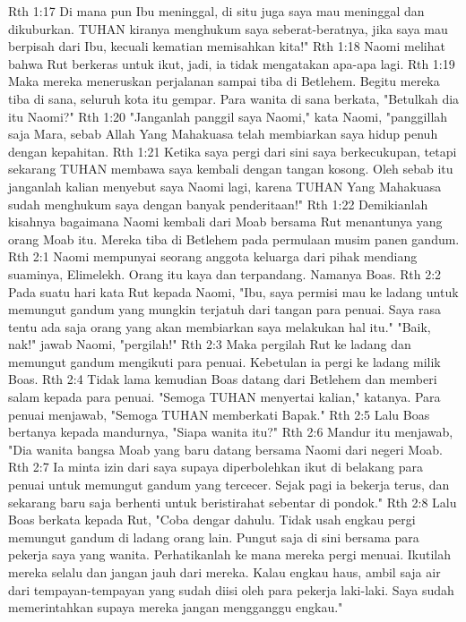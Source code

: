 Rth 1:17  Di mana pun Ibu meninggal, di situ juga saya mau meninggal dan dikuburkan. TUHAN kiranya menghukum saya seberat-beratnya, jika saya mau berpisah dari Ibu, kecuali kematian memisahkan kita!"
Rth 1:18  Naomi melihat bahwa Rut berkeras untuk ikut, jadi, ia tidak mengatakan apa-apa lagi.
Rth 1:19  Maka mereka meneruskan perjalanan sampai tiba di Betlehem. Begitu mereka tiba di sana, seluruh kota itu gempar. Para wanita di sana berkata, "Betulkah dia itu Naomi?"
Rth 1:20  "Janganlah panggil saya Naomi," kata Naomi, "panggillah saja Mara, sebab Allah Yang Mahakuasa telah membiarkan saya hidup penuh dengan kepahitan.
Rth 1:21  Ketika saya pergi dari sini saya berkecukupan, tetapi sekarang TUHAN membawa saya kembali dengan tangan kosong. Oleh sebab itu janganlah kalian menyebut saya Naomi lagi, karena TUHAN Yang Mahakuasa sudah menghukum saya dengan banyak penderitaan!"
Rth 1:22  Demikianlah kisahnya bagaimana Naomi kembali dari Moab bersama Rut menantunya yang orang Moab itu. Mereka tiba di Betlehem pada permulaan musim panen gandum.
Rth 2:1  Naomi mempunyai seorang anggota keluarga dari pihak mendiang suaminya, Elimelekh. Orang itu kaya dan terpandang. Namanya Boas.
Rth 2:2  Pada suatu hari kata Rut kepada Naomi, "Ibu, saya permisi mau ke ladang untuk memungut gandum yang mungkin terjatuh dari tangan para penuai. Saya rasa tentu ada saja orang yang akan membiarkan saya melakukan hal itu." "Baik, nak!" jawab Naomi, "pergilah!"
Rth 2:3  Maka pergilah Rut ke ladang dan memungut gandum mengikuti para penuai. Kebetulan ia pergi ke ladang milik Boas.
Rth 2:4  Tidak lama kemudian Boas datang dari Betlehem dan memberi salam kepada para penuai. "Semoga TUHAN menyertai kalian," katanya. Para penuai menjawab, "Semoga TUHAN memberkati Bapak."
Rth 2:5  Lalu Boas bertanya kepada mandurnya, "Siapa wanita itu?"
Rth 2:6  Mandur itu menjawab, "Dia wanita bangsa Moab yang baru datang bersama Naomi dari negeri Moab.
Rth 2:7  Ia minta izin dari saya supaya diperbolehkan ikut di belakang para penuai untuk memungut gandum yang tercecer. Sejak pagi ia bekerja terus, dan sekarang baru saja berhenti untuk beristirahat sebentar di pondok."
Rth 2:8  Lalu Boas berkata kepada Rut, "Coba dengar dahulu. Tidak usah engkau pergi memungut gandum di ladang orang lain. Pungut saja di sini bersama para pekerja saya yang wanita. Perhatikanlah ke mana mereka pergi menuai. Ikutilah mereka selalu dan jangan jauh dari mereka. Kalau engkau haus, ambil saja air dari tempayan-tempayan yang sudah diisi oleh para pekerja laki-laki. Saya sudah memerintahkan supaya mereka jangan mengganggu engkau."
